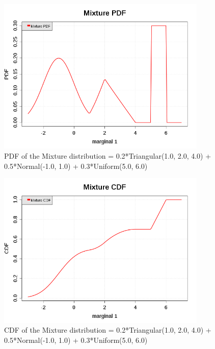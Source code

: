 \begin{figure}[H]
  \begin{center}
    \includegraphics[width=10cm]{pdf_Mixture.png}
    \caption{PDF of the Mixture distribution = 0.2*Triangular(1.0, 2.0, 4.0) + 0.5*Normal(-1.0, 1.0) + 0.3*Uniform(5.0, 6.0)}
    \label{mixtureGraphPDF}
  \end{center}
\end{figure}

\begin{figure}[H]
  \begin{center}
    \includegraphics[width=10cm]{cdf_Mixture.png}
    \caption{CDF of the Mixture distribution = 0.2*Triangular(1.0, 2.0, 4.0) + 0.5*Normal(-1.0, 1.0) + 0.3*Uniform(5.0, 6.0)}
    \label{mixtureGraphCDF}
  \end{center}
\end{figure}

